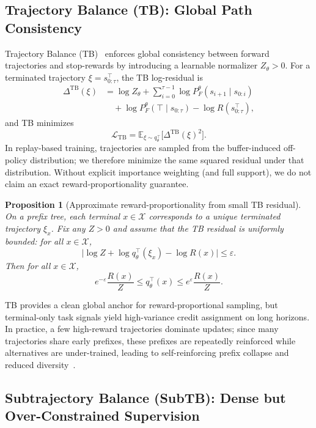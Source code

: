 \documentclass{article}
\theoremstyle{plain}
\newtheorem{proposition}[theorem]{Proposition}
\theoremstyle{definition}
\theoremstyle{remark}
\begin{document}
\subsection{Trajectory Balance (TB): Global Path Consistency}

Trajectory Balance (TB)~\citep{malkin2022trajectory} enforces global consistency between forward trajectories and stop-rewards by introducing a learnable normalizer $Z_\theta>0$.
For a terminated trajectory $\xi = s_{0:\tau}^{\top}$, the TB log-residual is
\begin{equation}
\label{eq:tb_llm}
\begin{aligned}
\Delta^{\mathrm{TB}}(\xi)
&=
\log Z_\theta
+
\sum_{i=0}^{\tau-1}\log P_F^\theta(s_{i+1}\mid s_{0:i})
\\
&\quad+
\log P_F^\theta(\top\mid s_{0:\tau})
-
\log R(s_{0:\tau}^{\top}),
\end{aligned}
\end{equation}
and TB minimizes
\[
\mathcal{L}_{\mathrm{TB}}
=
\mathbb{E}_{\xi\sim q_\theta^{\top}}
\big[\Delta^{\mathrm{TB}}(\xi)^2\big].
\]
In replay-based training, trajectories are sampled from the buffer-induced off-policy distribution; we therefore minimize the same squared residual under that distribution. Without explicit importance weighting (and full support), we do not claim an exact reward-proportionality guarantee.

\begin{proposition}[Approximate reward-proportionality from small TB residual]
On a prefix tree, each terminal $x\in\mathcal{X}$ corresponds to a unique terminated trajectory $\xi_x$.
Fix any $Z>0$ and assume that the TB residual is uniformly bounded: for all $x\in\mathcal{X}$,
\[
\big|\log Z + \log q_\theta^{\top}(\xi_x) - \log R(x)\big|\le \varepsilon.
\]
Then for all $x\in\mathcal{X}$,
\[
e^{-\varepsilon}\frac{R(x)}{Z}\le q_\theta^{\top}(x)\le e^{\varepsilon}\frac{R(x)}{Z}.
\]
\end{proposition}


TB provides a clean global anchor for reward-proportional sampling, but terminal-only task signals yield high-variance credit assignment on long horizons. In practice, a few high-reward trajectories dominate updates; since many trajectories share early prefixes, these prefixes are repeatedly reinforced while alternatives are under-trained, leading to self-reinforcing prefix collapse and reduced diversity~\citep{pmlr-v202-shen23a,madan2023learning}.

\subsection{Subtrajectory Balance (SubTB): Dense but Over-Constrained Supervision}
\end{document}
